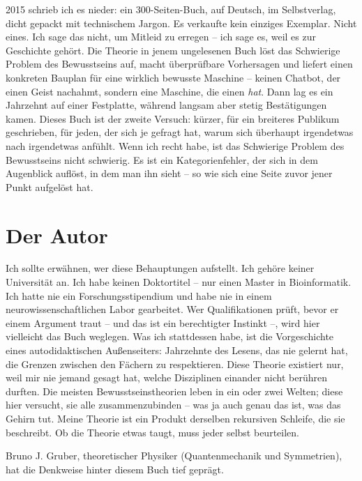 \documentclass[11pt, twoside, openright]{book}
\begin{document}
2015 schrieb ich es nieder: ein 300-Seiten-Buch, auf Deutsch, im Selbstverlag, dicht gepackt mit technischem Jargon. Es verkaufte kein einziges Exemplar. Nicht eines. Ich sage das nicht, um Mitleid zu erregen -- ich sage es, weil es zur Geschichte gehört. Die Theorie in jenem ungelesenen Buch löst das Schwierige Problem des Bewusstseins auf, macht überprüfbare Vorhersagen und liefert einen konkreten Bauplan für eine wirklich bewusste Maschine -- keinen Chatbot, der einen Geist nachahmt, sondern eine Maschine, die einen \textit{hat}. Dann lag es ein Jahrzehnt auf einer Festplatte, während langsam aber stetig Bestätigungen kamen. Dieses Buch ist der zweite Versuch: kürzer, für ein breiteres Publikum geschrieben, für jeden, der sich je gefragt hat, warum sich überhaupt irgendetwas nach irgendetwas anfühlt. Wenn ich recht habe, ist das Schwierige Problem des Bewusstseins nicht schwierig. Es ist ein Kategorienfehler, der sich in dem Augenblick auflöst, in dem man ihn sieht -- so wie sich eine Seite zuvor jener Punkt aufgelöst hat.


\chapter*{Der Autor}

Ich sollte erwähnen, wer diese Behauptungen aufstellt. Ich gehöre keiner Universität an. Ich habe keinen Doktortitel -- nur einen Master in Bioinformatik. Ich hatte nie ein Forschungsstipendium und habe nie in einem neurowissenschaftlichen Labor gearbeitet. Wer Qualifikationen prüft, bevor er einem Argument traut -- und das ist ein berechtigter Instinkt --, wird hier vielleicht das Buch weglegen. Was ich stattdessen habe, ist die Vorgeschichte eines autodidaktischen Außenseiters: Jahrzehnte des Lesens, das nie gelernt hat, die Grenzen zwischen den Fächern zu respektieren. Diese Theorie existiert nur, weil mir nie jemand gesagt hat, welche Disziplinen einander nicht berühren durften. Die meisten Bewusstseinstheorien leben in ein oder zwei Welten; diese hier versucht, sie alle zusammenzubinden -- was ja auch genau das ist, was das Gehirn tut. Meine Theorie ist ein Produkt derselben rekursiven Schleife, die sie beschreibt. Ob die Theorie etwas taugt, muss jeder selbst beurteilen.

Bruno J. Gruber, theoretischer Physiker (Quantenmechanik und Symmetrien), hat die Denkweise hinter diesem Buch tief geprägt.

\mainmatter
\pagestyle{fancy}
\end{document}
